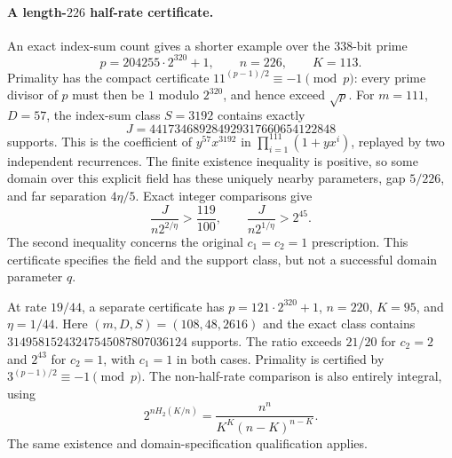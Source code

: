 \paragraph{A length-$226$ half-rate certificate.}
An exact index-sum count gives a shorter example over the $338$-bit prime
\[
 p=204255\cdot2^{320}+1,\qquad n=226,\qquad K=113.
\]
Primality has the compact certificate
$11^{(p-1)/2}\equiv-1\pmod p$: every prime divisor of $p$ must then
be $1$ modulo $2^{320}$, and hence exceed $\sqrt p$.
For $m=111$, $D=57$, the index-sum class $S=3192$ contains exactly
\[
 J=441734689284929317660654122848
\]
supports. This is the coefficient of $y^{57}x^{3192}$ in
$\prod_{i=1}^{111}(1+yx^i)$, replayed by two independent recurrences.
The finite existence inequality is positive, so some domain over this
explicit field has these uniquely nearby parameters, gap $5/226$,
and far separation $4\eta/5$. Exact integer comparisons give
\[
 \frac{J}{n2^{2/\eta}}>\frac{119}{100},\qquad
 \frac{J}{n2^{1/\eta}}>2^{45}.
\]
The second inequality concerns the original $c_1=c_2=1$ prescription.
This certificate specifies the field and the support class, but not a
successful domain parameter $q$.

At rate $19/44$, a separate certificate has
$p=121\cdot2^{320}+1$, $n=220$, $K=95$, and $\eta=1/44$.
Here $(m,D,S)=(108,48,2616)$ and the exact class contains
$31495815243247545087807036124$ supports. The ratio exceeds $21/20$
for $c_2=2$ and $2^{43}$ for $c_2=1$, with $c_1=1$ in both cases.
Primality is certified by $3^{(p-1)/2}\equiv-1\pmod p$.
The non-half-rate comparison is also entirely integral, using
\[
 2^{nH_2(K/n)}=\frac{n^n}{K^K(n-K)^{n-K}}.
\]
The same existence and domain-specification qualification applies.
